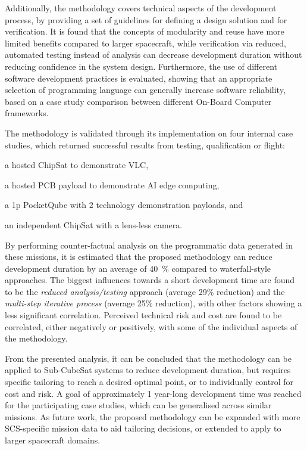 \documentclass[a4paper,nobib,justified,final]{tufte-book}
\begin{document}
\begin{fullwidth}
	Additionally, the methodology covers technical aspects of the development process, by providing a set of guidelines for defining a design solution and for verification. It is found that the concepts of modularity and reuse have more limited benefits compared to larger spacecraft, while verification via reduced, automated testing instead of analysis can decrease development duration without reducing confidence in the system design. Furthermore, the use of different software development practices is evaluated, showing that an appropriate selection of programming language can generally increase software reliability, based on a case study comparison between different On-Board Computer frameworks.
	
	The methodology is validated through its implementation on four internal case studies, which returned successful results from testing, qualification or flight: \begin{enumerate*}
		\item a hosted ChipSat to demonstrate \acl{VLC},
		\item a hosted \acs{PCB} payload to demonstrate \acs{AI} edge computing,
		\item a 1p PocketQube with 2 technology demonstration payloads, and
		\item an independent ChipSat with a lens-less camera.
	\end{enumerate*} %
	
	By performing counter-factual analysis on the programmatic data generated in these missions, it is estimated that the proposed methodology can reduce development duration by an average of \qty{40}{\percent} compared to waterfall-style approaches. The biggest influences towards a short development time are found to be the \emph{reduced analysis/testing} approach (average 29\% reduction) and the \emph{multi-step iterative process} (average 25\% reduction), with other factors showing a less significant correlation. Perceived technical risk and cost are found to be correlated, either negatively or positively, with some of the individual aspects of the methodology.

	From the presented analysis, it can be concluded that the methodology can be applied to Sub-CubeSat systems to reduce development duration, but requires specific tailoring to reach a desired optimal point, or to individually control for cost and risk.
	A goal of approximately 1 year-long development time was reached for the participating case studies, which can be generalised across similar missions.
	As future work, the proposed methodology can be expanded with more \acs{SCS}-specific mission data to aid tailoring decisions, or extended to apply to larger spacecraft domains.

\end{fullwidth}
\end{document}
